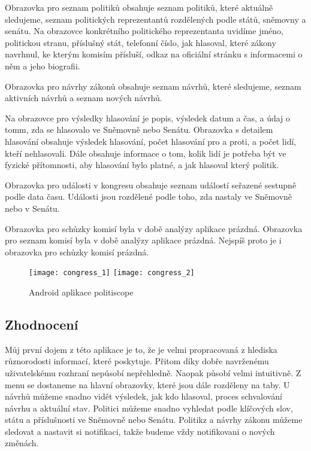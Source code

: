 Obrazovka pro seznam politiků obsahuje seznam politiků, které aktuálně sledujeme, seznam politických reprezentantů rozdělených podle států, sněmovny a senátu. Na obrazovce konkrétního politického reprezentanta uvidíme jméno, politickou stranu, příslušný stát, telefonní číslo, jak hlasoval, které zákony navrhnul, ke kterým komisím přísluší, odkaz na oficiální stránku s informacemi o něm a jeho biografii. 

Obrazovka pro návrhy zákonů obsahuje seznam návrhů, které sledujeme, seznam aktivních návrhů a seznam nových návrhů.

Na obrazovce pro výsledky hlasování je popis, výsledek datum a čas, a údaj o tomm, zda se hlasovalo ve Sněmovně nebo Senátu. Obrazovka s detailem hlasování obsahuje výsledek hlasování, počet hlasování pro a proti, a počet lidí, kteří nehlasovali. Dále obsahuje informace o tom, kolik lidí je potřeba být ve fyzické přítomnosti, aby hlasování bylo platné, a jak hlasoval který politik.

Obrazovka pro události v kongresu obsahuje seznam událostí seřazené sestupně podle data času. Události jsou rozdělené podle toho, zda nastaly ve Sněmovně nebo v Senátu. 

Obrazovka pro schůzky komisí byla v době analýzy aplikace prázdná. Obrazovka pro seznam komisí byla v době analýzy aplikace prázdná. Nejspíš proto je i obrazovka pro schůzky komisí prázdná.
 
\begin{figure}
	\centering
	
	\texttt{[image: congress\_1]}
	\texttt{[image: congress\_2]}
	
	\caption{Android aplikace politiscope}
	\label{fig:politoscope}
\end{figure}

\subsection{Zhodnocení}
Můj první dojem z této aplikace je to, že je velmi propracovaná z hlediska různorodosti informací, které poskytuje. Přitom díky dobře navrženému uživatelskému rozhraní nepůsobí nepřehledně. Naopak působí velmi intuitivně. Z menu se dostaneme na hlavní obrazovky, které jsou dále rozděleny na taby. U návrhů můžeme snadno vidět výsledek, jak kdo hlasoval, proces schvalování návrhu a aktuální stav. Politici můžeme snadno vyhledat podle klíčových slov, státu a příslušnosti ve Sněmovně nebo Senátu. Politikz a návrhy zákonu můžeme sledovat a nastavit si notifikaci, takže budeme vždy notifikovani o nových změnách.

